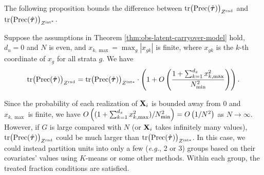 	The following proposition bounds the difference between $ \mathrm{tr} \big(\mathrm{Prec}(\hat{\bm{\tau}})  \big)_{Z^{\textnormal{rnd}}} $ and $ \mathrm{tr} \big(\mathrm{Prec}(\hat{\bm{\tau}})  \big)_{Z^{\mathrm{int}^\ast}} $.
	\begin{proposition}
		\label{prop:rounding-error-obs-cov}
		Suppose the assumptions in Theorem \ref{thm:obs-latent-carryover-model} hold, $d_u = 0$ and $N$ is even, and $x_{k,\max} = \max_{g} |x_{gk}|$ is finite, where $x_{gk}$ is the $k$-th coordinate of $x_g$ for all strata $g$. We have
		\[ \mathrm{tr} \big(\mathrm{Prec}(\hat{\bm{\tau}})  \big)_{Z^{\textnormal{rnd}}} = \mathrm{tr} \big(\mathrm{Prec}(\hat{\bm{\tau}})  \big)_{Z^{\mathrm{int}\ast}}  \cdot\left(1+ O\left(\frac{1+ \sum_{k=1}^{d_x} x_{k,\max}^2}{N^2_{\min}} \right) \right).\]
	\end{proposition}


    Since the probability of each realization of $\mathbf{X}_i$ is bounded away from 0 and $x_{k,\max}$ is finite,  we have $O\left((1+ \sum_{k=1}^{d_x} x_{k,\max}^2)/N^2_{\min} \right)  = O \left( 1/N^2 \right)$ as $N \rightarrow \infty$. However, if $G$ is large compared with $N$ (or $\mathbf{X}_i$ takes infinitely many values), $ \mathrm{tr} \big(\mathrm{Prec}(\hat{\bm{\tau}})  \big)_{Z^{\textnormal{rnd}}} $ could be much larger than $ \mathrm{tr} \big(\mathrm{Prec}(\hat{\bm{\tau}})  \big)_{Z^{\mathrm{int}\ast}} $. In this case, we could instead partition units into only a few ({\it e.g.}, 2 or 3) groups based on their covariates' values using $K$-means or some other methods. Within each group, the treated fraction conditions are satisfied. 
    
